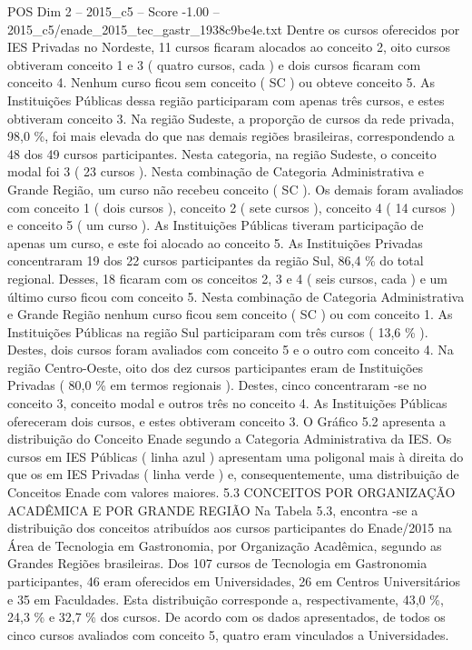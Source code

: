 \begin{textsample}{POS Dim 2 – 2015\_c5 – Score -1.00 – 2015\_c5/enade\_2015\_tec\_gastr\_1938c9be4e.txt}
Dentre os cursos oferecidos por IES Privadas no Nordeste, 11 cursos ficaram alocados ao conceito 2, oito cursos obtiveram conceito 1 e 3 ( quatro cursos, cada ) e dois cursos ficaram com conceito 4.
Nenhum curso ficou sem conceito ( SC ) ou obteve conceito 5.
As Instituições Públicas dessa região participaram com apenas três cursos, e estes obtiveram conceito 3.
Na região Sudeste, a proporção de cursos da rede privada, 98,0 \%, foi mais elevada do que nas demais regiões brasileiras, correspondendo a 48 dos 49 cursos participantes.
Nesta categoria, na região Sudeste, o conceito modal foi 3 ( 23 cursos ).
Nesta combinação de Categoria Administrativa e Grande Região, um curso não recebeu conceito ( SC ).
Os demais foram avaliados com conceito 1 ( dois cursos ), conceito 2 ( sete cursos ), conceito 4 ( 14 cursos ) e conceito 5 ( um curso ).
As Instituições Públicas tiveram participação de apenas um curso, e este foi alocado ao conceito 5.
As Instituições Privadas concentraram 19 dos 22 cursos participantes da região Sul, 86,4 \% do total regional.
Desses, 18 ficaram com os conceitos 2, 3 e 4 ( seis cursos, cada ) e um último curso ficou com conceito 5.
Nesta combinação de Categoria Administrativa e Grande Região nenhum curso ficou sem conceito ( SC ) ou com conceito 1.
As Instituições Públicas na região Sul participaram com três cursos ( 13,6 \% ).
Destes, dois cursos foram avaliados com conceito 5 e o outro com conceito 4.
Na região Centro-Oeste, oito dos dez cursos participantes eram de Instituições Privadas ( 80,0 \% em termos regionais ).
Destes, cinco concentraram -se no conceito 3, conceito modal e outros três no conceito 4.
As Instituições Públicas ofereceram dois cursos, e estes obtiveram conceito 3.
O Gráfico 5.2 apresenta a distribuição do Conceito Enade segundo a Categoria Administrativa da IES.
Os cursos em IES Públicas ( linha azul ) apresentam uma poligonal mais à direita do que os em IES Privadas ( linha verde ) e, consequentemente, uma distribuição de Conceitos Enade com valores maiores. 5.3 CONCEITOS POR ORGANIZAÇÃO ACADÊMICA E POR GRANDE REGIÃO Na Tabela 5.3, encontra -se a distribuição dos conceitos atribuídos aos cursos participantes do Enade/2015 na Área de Tecnologia em Gastronomia, por Organização Acadêmica, segundo as Grandes Regiões brasileiras.
Dos 107 cursos de Tecnologia em Gastronomia participantes, 46 eram oferecidos em Universidades, 26 em Centros Universitários e 35 em Faculdades.
Esta distribuição corresponde a, respectivamente, 43,0 \%, 24,3 \% e 32,7 \% dos cursos.
De acordo com os dados apresentados, de todos os cinco cursos avaliados com conceito 5, quatro eram vinculados a Universidades.

\end{textsample}
